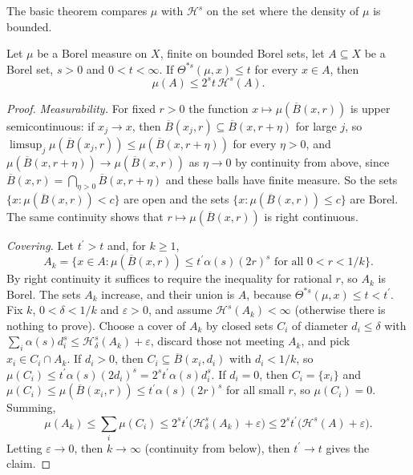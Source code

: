 The basic theorem compares $\mu$ with $\mathcal{H}^s$ on the set where the density of $\mu$ is bounded.

\begin{theorem}\label{measure-theory:theorem-density-comparison}
Let $\mu$ be a Borel measure on $X$, finite on bounded Borel sets, let $A \subseteq X$ be a Borel set, $s > 0$ and $0 < t < \infty$. If $\Theta^{*s}(\mu, x) \leq t$ for every $x \in A$, then
\[
\mu(A) \leq 2^st\,\mathcal{H}^s(A).
\]
\end{theorem}

\begin{proof}
\emph{Measurability.} For fixed $r > 0$ the function $x \mapsto \mu(\overline{B}(x, r))$ is upper semicontinuous: if $x_j \to x$, then $\overline{B}(x_j, r) \subseteq \overline{B}(x, r + \eta)$ for large $j$,
so $\limsup_j\mu(\overline{B}(x_j, r)) \leq \mu(\overline{B}(x, r + \eta))$ for every $\eta > 0$, and $\mu(\overline{B}(x, r + \eta)) \to \mu(\overline{B}(x, r))$ as $\eta \to 0$ by continuity from above, since
$\overline{B}(x, r) = \bigcap_{\eta > 0}\overline{B}(x, r + \eta)$ and these balls have finite measure. So the sets $\{x : \mu(\overline{B}(x, r)) < c\}$ are open and the sets
$\{x : \mu(\overline{B}(x, r)) \leq c\}$ are Borel. The same continuity shows that $r \mapsto \mu(\overline{B}(x, r))$ is right continuous.

\emph{Covering.} Let $t^{\prime} > t$ and, for $k \geq 1$,
\[
A_k = \bigl\{x \in A : \mu(\overline{B}(x, r)) \leq t^{\prime}\alpha(s)(2r)^s \text{ for all } 0 < r < 1/k\bigr\}.
\]
By right continuity it suffices to require the inequality for rational $r$, so $A_k$ is Borel. The sets $A_k$ increase, and their union is $A$, because $\Theta^{*s}(\mu, x) \leq t < t^{\prime}$. Fix $k$,
$0 < \delta < 1/k$ and $\varepsilon > 0$, and assume $\mathcal{H}^s(A_k) < \infty$ (otherwise there is nothing to prove). Choose a cover of $A_k$ by closed sets $C_i$ of diameter $d_i \leq \delta$ with
$\sum_i\alpha(s)d_i^s \leq \mathcal{H}^s_\delta(A_k) + \varepsilon$, discard those not meeting $A_k$, and pick $x_i \in C_i \cap A_k$. If $d_i > 0$, then $C_i \subseteq \overline{B}(x_i, d_i)$ with $d_i < 1/k$, so
$\mu(C_i) \leq t^{\prime}\alpha(s)(2d_i)^s = 2^st^{\prime}\alpha(s)d_i^s$. If $d_i = 0$, then $C_i = \{x_i\}$ and $\mu(C_i) \leq \mu(\overline{B}(x_i, r)) \leq t^{\prime}\alpha(s)(2r)^s$ for all small $r$, so
$\mu(C_i) = 0$. Summing,
\[
\mu(A_k) \leq \sum_i\mu(C_i) \leq 2^st^{\prime}\bigl(\mathcal{H}^s_\delta(A_k) + \varepsilon\bigr) \leq 2^st^{\prime}\bigl(\mathcal{H}^s(A) + \varepsilon\bigr).
\]
Letting $\varepsilon \to 0$, then $k \to \infty$ (continuity from below), then $t^{\prime} \to t$ gives the claim.
\end{proof}


